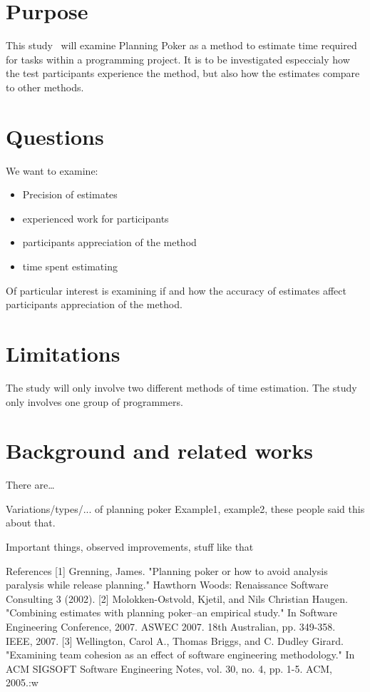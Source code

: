 \documentclass{sigchi}
\begin{document}
\section{Purpose}

This study  will examine Planning Poker as a method to estimate time required for tasks within a programming project. It is to be investigated especcialy how the test participants experience the method, but also how the estimates compare to other methods.

\section{Questions}
We want to examine:
\begin{itemize}
		\item Precision of estimates
		\item experienced work for participants
		\item participants appreciation of the method
		\item time spent estimating\cite{acrobat}
\end{itemize}
Of particular interest is examining if and how the accuracy of estimates affect participants appreciation of the method.

\section{Limitations}
The study will only involve two different methods of time estimation.
The study only involves one group of programmers.

\section{Background and related works}
There are…

Variations/types/... of planning poker
Example1, example2, these people said this about that.

Important things, observed improvements, stuff like that

References
[1] Grenning, James. "Planning poker or how to avoid analysis paralysis while release planning." Hawthorn Woods: Renaissance Software Consulting 3 (2002).
[2] Molokken-Ostvold, Kjetil, and Nils Christian Haugen. "Combining estimates with planning poker--an empirical study." In Software Engineering Conference, 2007. ASWEC 2007. 18th Australian, pp. 349-358. IEEE, 2007.
[3] Wellington, Carol A., Thomas Briggs, and C. Dudley Girard. "Examining team cohesion as an effect of software engineering methodology." In ACM SIGSOFT Software Engineering Notes, vol. 30, no. 4, pp. 1-5. ACM, 2005.:w
\end{document}
